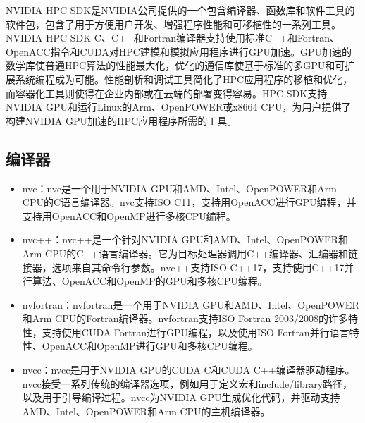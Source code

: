 \documentclass[a4paper,12pt,english]{sphinxmanual}
\begin{document}
\sphinxAtStartPar
NVIDIA HPC SDK是NVIDIA公司提供的一个包含编译器、函数库和软件工具的软件包，包含了用于方便用户开发、增强程序性能和可移植性的一系列工具。NVIDIA HPC SDK C、C++和Fortran编译器支持使用标准C++和Fortran、OpenACC指令和CUDA对HPC建模和模拟应用程序进行GPU加速。GPU加速的数学库使普通HPC算法的性能最大化，优化的通信库使基于标准的多GPU和可扩展系统编程成为可能。性能剖析和调试工具简化了HPC应用程序的移植和优化，而容器化工具则使得在企业内部或在云端的部署变得容易。HPC SDK支持NVIDIA GPU和运行Linux的Arm、OpenPOWER或x86\sphinxhyphen{}64 CPU，为用户提供了构建NVIDIA GPU加速的HPC应用程序所需的工具。


\subsection{编译器}
\label{\detokenize{gpu-computing/gpu-computing:id15}}\begin{itemize}
\item {} 
\sphinxAtStartPar
nvc：nvc是一个用于NVIDIA GPU和AMD、Intel、OpenPOWER和Arm CPU的C语言编译器。nvc支持ISO C11，支持用OpenACC进行GPU编程，并支持用OpenACC和OpenMP进行多核CPU编程。

\item {} 
\sphinxAtStartPar
nvc++：nvc++是一个针对NVIDIA GPU和AMD、Intel、OpenPOWER和Arm CPU的C++语言编译器。它为目标处理器调用C++编译器、汇编器和链接器，选项来自其命令行参数。nvc++支持ISO C++17，支持使用C++17并行算法、OpenACC和OpenMP的GPU和多核CPU编程。

\item {} 
\sphinxAtStartPar
nvfortran：nvfortran是一个用于NVIDIA GPU和AMD、Intel、OpenPOWER和Arm CPU的Fortran编译器。nvfortran支持ISO Fortran 2003/2008的许多特性，支持使用CUDA Fortran进行GPU编程，以及使用ISO Fortran并行语言特性、OpenACC和OpenMP进行GPU和多核CPU编程。

\item {} 
\sphinxAtStartPar
nvcc：nvcc是用于NVIDIA GPU的CUDA C和CUDA C++编译器驱动程序。nvcc接受一系列传统的编译器选项，例如用于定义宏和include/library路径，以及用于引导编译过程。nvcc为NVIDIA GPU生成优化代码，并驱动支持AMD、Intel、OpenPOWER和Arm CPU的主机编译器。

\end{itemize}
\end{document}
